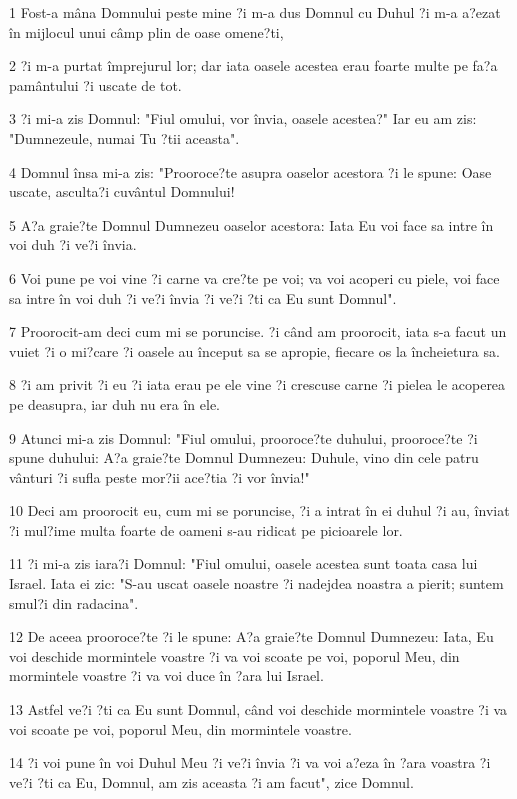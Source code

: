 \par 1 Fost-a mâna Domnului peste mine ?i m-a dus Domnul cu Duhul ?i m-a a?ezat în mijlocul unui câmp plin de oase omene?ti,
\par 2 ?i m-a purtat împrejurul lor; dar iata oasele acestea erau foarte multe pe fa?a pamântului ?i uscate de tot.
\par 3 ?i mi-a zis Domnul: "Fiul omului, vor învia, oasele acestea?" Iar eu am zis: "Dumnezeule, numai Tu ?tii aceasta".
\par 4 Domnul însa mi-a zis: "Prooroce?te asupra oaselor acestora ?i le spune: Oase uscate, asculta?i cuvântul Domnului!
\par 5 A?a graie?te Domnul Dumnezeu oaselor acestora: Iata Eu voi face sa intre în voi duh ?i ve?i învia.
\par 6 Voi pune pe voi vine ?i carne va cre?te pe voi; va voi acoperi cu piele, voi face sa intre în voi duh ?i ve?i învia ?i ve?i ?ti ca Eu sunt Domnul".
\par 7 Proorocit-am deci cum mi se poruncise. ?i când am proorocit, iata s-a facut un vuiet ?i o mi?care ?i oasele au început sa se apropie, fiecare os la încheietura sa.
\par 8 ?i am privit ?i eu ?i iata erau pe ele vine ?i crescuse carne ?i pielea le acoperea pe deasupra, iar duh nu era în ele.
\par 9 Atunci mi-a zis Domnul: "Fiul omului, prooroce?te duhului, prooroce?te ?i spune duhului: A?a graie?te Domnul Dumnezeu: Duhule, vino din cele patru vânturi ?i sufla peste mor?ii ace?tia ?i vor învia!"
\par 10 Deci am proorocit eu, cum mi se poruncise, ?i a intrat în ei duhul ?i au, înviat ?i mul?ime multa foarte de oameni s-au ridicat pe picioarele lor.
\par 11 ?i mi-a zis iara?i Domnul: "Fiul omului, oasele acestea sunt toata casa lui Israel. Iata ei zic: "S-au uscat oasele noastre ?i nadejdea noastra a pierit; suntem smul?i din radacina".
\par 12 De aceea prooroce?te ?i le spune: A?a graie?te Domnul Dumnezeu: Iata, Eu voi deschide mormintele voastre ?i va voi scoate pe voi, poporul Meu, din mormintele voastre ?i va voi duce în ?ara lui Israel.
\par 13 Astfel ve?i ?ti ca Eu sunt Domnul, când voi deschide mormintele voastre ?i va voi scoate pe voi, poporul Meu, din mormintele voastre.
\par 14 ?i voi pune în voi Duhul Meu ?i ve?i învia ?i va voi a?eza în ?ara voastra ?i ve?i ?ti ca Eu, Domnul, am zis aceasta ?i am facut", zice Domnul.
